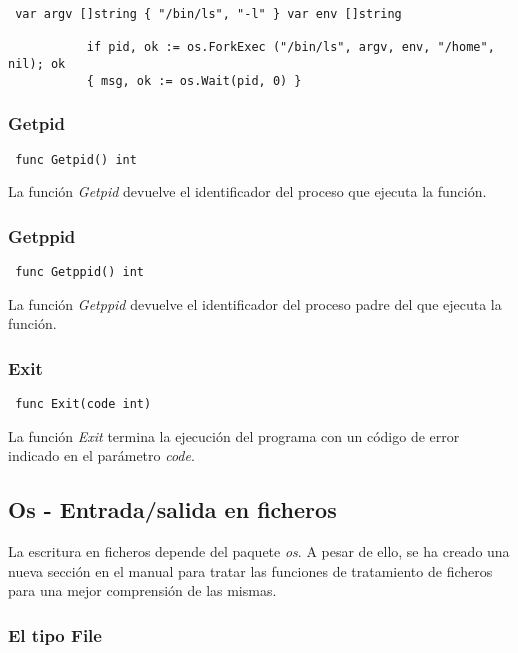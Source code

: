 		\begin{verbatim} var argv []string { "/bin/ls", "-l" } var env []string
		
		   if pid, ok := os.ForkExec ("/bin/ls", argv, env, "/home", nil); ok
		   { msg, ok := os.Wait(pid, 0) }	    \end{verbatim} \clearpage
		   \subsubsection{Getpid}

		\begin{verbatim} func Getpid() int \end{verbatim}
				
		La función \textit{Getpid} devuelve el identificador del proceso que
		ejecuta la función. 
		
		\subsubsection{Getppid}

		\begin{verbatim} func Getppid() int \end{verbatim}
				
		La función \textit{Getppid} devuelve el identificador del proceso padre
		del que ejecuta la función. 
		
		\subsubsection{Exit}

		\begin{verbatim} func Exit(code int) \end{verbatim}
				
		La función \textit{Exit} termina la ejecución del programa con un código
		de error indicado en el parámetro \textit{code}.
		
	\subsection{Os - Entrada/salida en ficheros}
	
	La escritura en ficheros depende del paquete \textit{os}. A pesar de ello,
	se ha creado una nueva sección en el manual para tratar las funciones de
	tratamiento de ficheros para una mejor comprensión de las mismas.
	
		\subsubsection{El tipo File}
		

